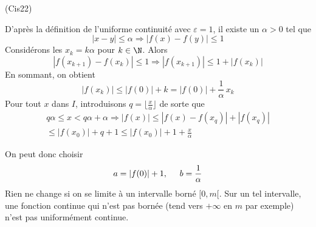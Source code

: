 \begin{tiny}(Cis22)\end{tiny} D'après la définition de l'uniforme continuité avec $\varepsilon=1$, il existe un $\alpha>0$ tel que 
\begin{displaymath}
|x-y|\leq \alpha \Rightarrow  |f(x)-f(y)|\leq 1 
\end{displaymath}
Considérons les $x_k = k\alpha$ pour $k\in\N$. Alors 
\begin{displaymath}
 |f(x_{k+1})-f(x_k)|\leq 1 
 \Rightarrow
|f(x_{k+1})| \leq 1 + |f(x_k)| 
\end{displaymath}
En sommant, on obtient
\begin{displaymath}
 |f(x_k)|\leq |f(0)| + k = |f(0)| + \frac{1}{\alpha}\, x_k
\end{displaymath}
Pour tout $x$ dans $I$, introduisons $q= \lfloor \frac{x}{\alpha} \rfloor$ de sorte que
\begin{multline*}
q\alpha \leq x < q\alpha+ \alpha 
\Rightarrow
 |f(x)|\leq |f(x)-f(x_q)|+|f(x_q)|\\
 \leq |f(x_0)| + q + 1 
\leq |f(x_0)|  + 1 + \frac{x}{\alpha}
\end{multline*}

On peut donc choisir
\begin{displaymath}
a = |f(0)| +1, \hspace{0.5cm} b=\frac{1}{\alpha}
\end{displaymath}
Rien ne change si on se limite à un intervalle borné $[0,m[$.\newline
Sur un tel intervalle, une fonction continue qui n'est pas bornée (tend vers $+\infty$ en $m$ par exemple) n'est pas uniformément continue.
